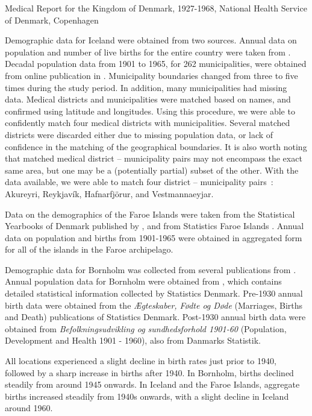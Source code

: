 \documentclass[10pt]{article}
\begin{document}
Medical Report for the Kingdom of Denmark,
1927-1968, National Health Service of Denmark, Copenhagen

Demographic data for Iceland were obtained from two sources. Annual data on population and number of live births for the entire country were taken from \cite{Cliff1983B}. Decadal population data from 1901 to 1965, for 262 municipalities, were obtained from online publication in \cite{StatsIceland}. Municipality boundaries changed from three to five times during the study period. In addition, many municipalities had missing data. Medical districts and municipalities were matched based on names, and confirmed using latitude and longitudes. Using this procedure, we were able to confidently match four medical districts with municipalities. Several matched districts were discarded either due to missing population data, or lack of confidence in the matching of the geographical boundaries. It is also worth noting that matched medical district -- municipality pairs may not encompass the exact same area, but one may be a (potentially partial) subset of the other. With the data available, we were able to match four district -- municipality pairs~: Akureyri, Reykjav\'{i}k, Hafnarfj\"{o}r\dh{}ur, and Vestmannaeyjar.

Data on the demographics of the Faroe Islands were taken from the Statistical Yearbooks of Denmark published by \cite{StatsDenmark}, and from Statistics Faroe Islands \cite{StatsFaroe}. Annual data on population and births from 1901-1965 were obtained in aggregated form for all of the islands in the Faroe archipelago. 

Demographic data for Bornholm was collected from several publications from \cite{StatsDenmark}. Annual population data for Bornholm were obtained from \cite{StatsDenmark}, which contains detailed statistical information collected by Statistics Denmark. Pre-1930 annual birth data were obtained from the \textit{\AE{}gteskaber, F\o{}dte og D\o{}de} (Marriages, Births and Death) publications of Statistics Denmark. Post-1930 annual birth data were obtained from \textit{Befolkningsudvikling og sundhedsforhold 1901-60} (Population, Development and Health 1901 - 1960), also from Danmarks Statistik.

All locations experienced a slight decline in birth rates just prior to 1940, followed by a sharp increase in births after 1940. In Bornholm, births declined steadily from around 1945 onwards. In Iceland and the Faroe Islands, aggregate births increased steadily from 1940s onwards, with a slight decline in Iceland around 1960.
\end{document}
